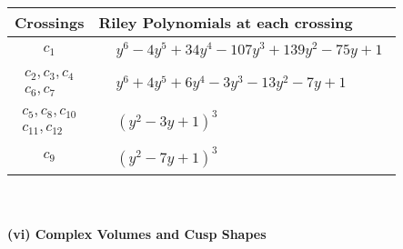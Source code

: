 \documentclass[1p]{elsarticle_modified}
\theoremstyle{definition}
\begin{document}
\begin{tabular}{m{50pt}|m{274pt}}
Crossings & \hspace{64pt}Riley Polynomials at each crossing \\
\hline $$\begin{aligned}c_{1}\end{aligned}$$&$\begin{aligned}
&y^6-4 y^5+34 y^4-107 y^3+139 y^2-75 y+1
\end{aligned}$\\
\hline $$\begin{aligned}c_{2},c_{3},c_{4}\\c_{6},c_{7}\end{aligned}$$&$\begin{aligned}
&y^6+4 y^5+6 y^4-3 y^3-13 y^2-7 y+1
\end{aligned}$\\
\hline $$\begin{aligned}c_{5},c_{8},c_{10}\\c_{11},c_{12}\end{aligned}$$&$\begin{aligned}
&(y^2-3 y+1)^3
\end{aligned}$\\
\hline $$\begin{aligned}c_{9}\end{aligned}$$&$\begin{aligned}
&(y^2-7 y+1)^3
\end{aligned}$\\
\hline
\end{tabular}\\~\\
\newpage\flushleft \textbf{(vi) Complex Volumes and Cusp Shapes}
\end{document}
